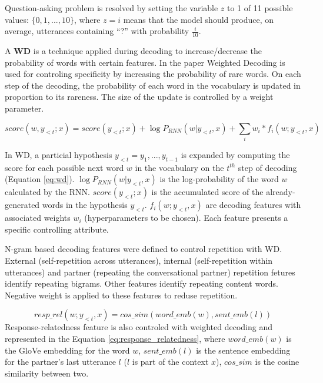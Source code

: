 Question-asking problem is resolved by setting the variable $z$ to 1 of 11 possible values: $\{0, 1, ..., 10\}$, where $z=i$ means that the model should produce, on average, utterances containing ``?'' with probability $\frac{i}{10}$.

A \textbf{WD} is a technique applied during decoding to increase/decrease the probability of words with certain features. In the paper Weighted Decoding is used for controling specificity by increasing the probability of rare words. On each step of the decoding, the probability of each word in the vocabulary is updated in proportion to its rareness. The size of the update is controlled by a weight parameter. 

\begin{equation} \label{eq:wd}
score(w, y_{<t}; x) = score(y_{<t}; x) + \log P_{RNN}(w|y_{<t}, x) + \sum_i w_i * f_i(w; y_{<t}, x)
\end{equation}

In WD, a particial hypothesis $y_{<t} = y_1, ..., y_{t-1}$ is expanded by computing the score for each possible next word $w$ in the vocabulary on the $t^{th}$ step of decoding (Equation \ref{eq:wd}). $\log P_{RNN}(w|y_{<t}, x)$ is the log-probability of the word $w$ calculated by the RNN. $score(y_{<t}; x)$ is the accumulated score of the already-generated words in the hypothesis $y_{<t}$. $f_i(w; y_{<t}, x)$ are decoding features with associated weights $w_i$ (hyperparameters to be chosen). Each feature presents a specific controlling attribute.

N-gram based decoding features were defined to control repetition with WD. External (self-repetition across utterances), internal (self-repetition within utterances) and partner (repeating the conversational partner) repetition fetures identify repeating bigrams. Other features identify repeating content words. Negative weight is applied to these features to reduse repetition.

\begin{equation} \label{eq:response_relatedness}
resp\_rel(w; y_{<t}, x) = cos\_sim(word\_emb(w), sent\_emb(l)) 
\end{equation}
Response-relatedness feature is also controled with weighted decoding and represented in the Equation \ref{eq:response_relatedness}, where $word\_emb(w)$ is the GloVe embedding for the word $w$, $sent\_emb(l)$ is the sentence embedding for the partner's last utterance $l$ ($l$ is part of the context $x$), $cos\_sim$ is the cosine similarity between two.

